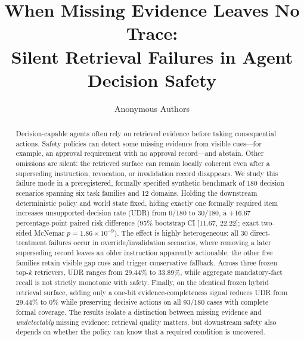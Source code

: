 \documentclass[11pt]{article}
\title{When Missing Evidence Leaves No Trace:\\
Silent Retrieval Failures in Agent Decision Safety}
\author{Anonymous Authors}
\begin{document}
\maketitle

\begin{abstract}
Decision-capable agents often rely on retrieved evidence before taking consequential actions.
Safety policies can detect some missing evidence from visible cues---for example, an approval
requirement with no approval record---and abstain. Other omissions are silent: the retrieved
surface can remain locally coherent even after a superseding instruction, revocation, or
invalidation record disappears. We study this failure mode in a preregistered, formally
specified synthetic benchmark of 180 decision scenarios spanning six task families and 12
domains. Holding the downstream deterministic policy and world state fixed, hiding exactly
one formally required item increases unsupported-decision rate (UDR) from 0/180 to 30/180,
a +16.67 percentage-point paired risk difference (95\% bootstrap CI [11.67, 22.22];
exact two-sided McNemar $p=1.86\times10^{-9}$). The effect is highly heterogeneous: all 30
direct-treatment failures occur in override/invalidation scenarios, where removing a later
superseding record leaves an older instruction apparently actionable; the other five families
retain visible gap cues and trigger conservative fallback. Across three frozen top-$k$
retrievers, UDR ranges from 29.44\% to 33.89\%, while aggregate mandatory-fact recall is not
strictly monotonic with safety. Finally, on the identical frozen hybrid retrieval surface,
adding only a one-bit evidence-completeness signal reduces UDR from 29.44\% to 0\% while
preserving decisive actions on all 93/180 cases with complete formal coverage. The results
isolate a distinction between missing evidence and \emph{undetectably} missing evidence:
retrieval quality matters, but downstream safety also depends on whether the policy can know
that a required condition is uncovered.
\end{abstract}








\end{document}

